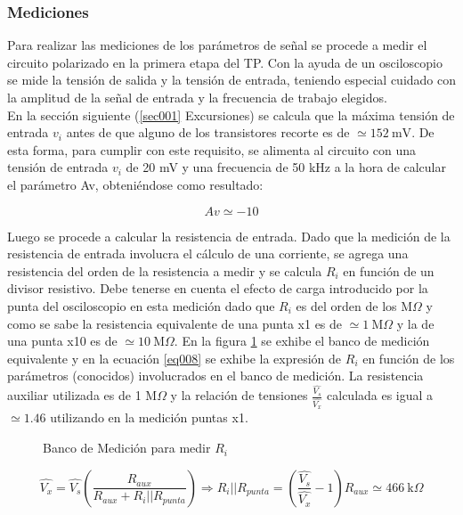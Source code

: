 \documentclass[a4paper,10pt]{article}
\begin{document}
			\subsubsection{Mediciones}
				Para realizar las mediciones de los parámetros de señal se procede a medir el circuito polarizado en la primera etapa del TP. Con la ayuda de
				un osciloscopio se mide la tensión de salida y la tensión de entrada, teniendo especial cuidado con la amplitud de la señal de entrada y
				la frecuencia de trabajo elegidos.\\
				\indent  En la sección siguiente (\ref{sec001} Excursiones) se calcula que la máxima tensión de entrada $v_i$ antes de que alguno de los transistores 
				recorte es de $\simeq 152~\text{mV}$. De esta forma, para cumplir con este requisito, se alimenta al circuito con una tensión de entrada $v_i$ 
				de 20 mV y una frecuencia de 50 kHz a la hora de calcular el parámetro Av, obteniéndose como resultado:

				\begin{displaymath}
					Av \simeq -10
				\end{displaymath}  	

				Luego se procede a calcular la resistencia de entrada. Dado que la medición de la resistencia de entrada involucra el cálculo de una corriente,
				se agrega una resistencia del orden de la resistencia a medir y se calcula $R_i$ en función de un divisor resistivo. Debe tenerse en 
				cuenta el efecto de carga introducido por la punta del osciloscopio en esta medición dado que $R_i$ es del orden de los M$\Omega$ y como se
				sabe la resistencia equivalente de una punta x1 es de $\simeq 1~\text{M}\Omega$ y la de una punta x10 es de $\simeq 10~\text{M}\Omega$. En
				la figura \ref{circ004} se exhibe el banco de medición equivalente y en la ecuación \ref{eq008} se exhibe la expresión de $R_i$ en función
				de los parámetros (conocidos) involucrados en el banco de medición. La resistencia auxiliar utilizada es de 1 M$\Omega$ y la relación de
				tensiones $\frac{\hat{V_{s}}}{\hat{V_{x}}}$ calculada es igual a $\simeq 1.46$ utilizando en la medición puntas x1. 
			 
				\begin{figure}[!htp]
					\centering
			 		
	   			\caption{Banco de Medición para medir $R_i$} \label{circ004} 
		 		\end{figure}

				\begin{equation}
					\label{eq008}
					\hat{V_{x}} = \hat{V_{s}} \left( \frac{R_{aux}}{R_{aux} + R_{i}||R_{punta}}\right) \Rightarrow R_{i}||R_{punta} = 
					\left(\frac{\hat{V_s}}{\hat{V_x}} -1\right) R_{aux} \simeq 466~\text{k}\Omega 
				\end{equation}
\end{document}
